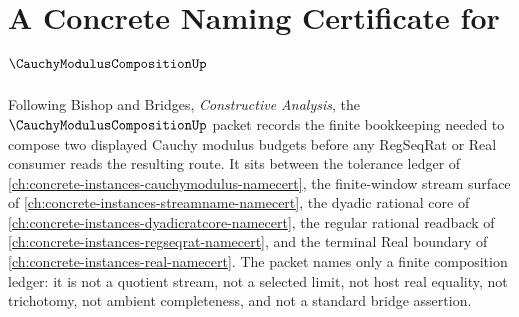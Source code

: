 \chapter{A Concrete Naming Certificate for $\CauchyModulusCompositionUp$}
\label{ch:concrete-instances-cauchy-modulus-composition-namecert}

Following Bishop and Bridges, \emph{Constructive Analysis}, the $\CauchyModulusCompositionUp$ packet records the finite bookkeeping needed to compose two displayed Cauchy modulus budgets before any RegSeqRat or Real consumer reads the resulting route. It sits between the tolerance ledger of \autoref{ch:concrete-instances-cauchymodulus-namecert}, the finite-window stream surface of \autoref{ch:concrete-instances-streamname-namecert}, the dyadic rational core of \autoref{ch:concrete-instances-dyadicratcore-namecert}, the regular rational readback of \autoref{ch:concrete-instances-regseqrat-namecert}, and the terminal Real boundary of \autoref{ch:concrete-instances-real-namecert}. The packet names only a finite composition ledger: it is not a quotient stream, not a selected limit, not host real equality, not trichotomy, not ambient completeness, and not a standard bridge assertion.

